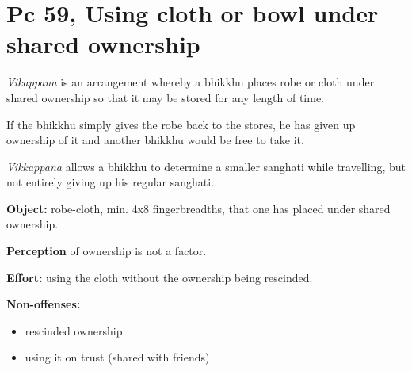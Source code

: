 \section{Pc 59, Using cloth or bowl under shared ownership}

\emph{Vikappana} is an arrangement whereby a bhikkhu places robe or
cloth under shared ownership so that it may be stored for any length of
time.

If the bhikkhu simply gives the robe back to the stores, he has given up
ownership of it and another bhikkhu would be free to take it.

\emph{Vikkappana} allows a bhikkhu to determine a smaller sanghati while
travelling, but not entirely giving up his regular sanghati.

\textbf{Object:} robe-cloth, min. 4x8 fingerbreadths, that one has
placed under shared ownership.

\textbf{Perception} of ownership is not a factor.

\textbf{Effort:} using the cloth without the ownership being rescinded.

\textbf{Non-offenses:}

\begin{itemize}
\tightlist
\item
  rescinded ownership
\item
  using it on trust (shared with friends)
\end{itemize}

\clearpage
\thispagestyle{empty}
\enlargethispage{3\baselineskip}
\vspace*{-3\baselineskip}



